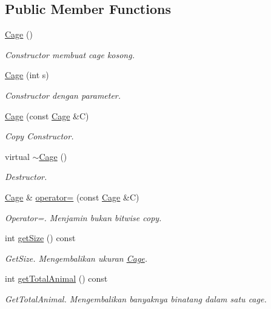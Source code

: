 \subsection*{Public Member Functions}
\begin{DoxyCompactItemize}
\item 
\hyperlink{classCage_ac03246dd263ee9fe6f37336317e62b69}{Cage} ()
\begin{DoxyCompactList}\small\item\em Constructor membuat cage kosong. \end{DoxyCompactList}\item 
\hyperlink{classCage_a8cd728b1eb23303888a153230f96490e}{Cage} (int s)
\begin{DoxyCompactList}\small\item\em Constructor dengan parameter. \end{DoxyCompactList}\item 
\hyperlink{classCage_ae91dd77b358348f937432b6c48b17ea1}{Cage} (const \hyperlink{classCage}{Cage} \&C)
\begin{DoxyCompactList}\small\item\em Copy Constructor. \end{DoxyCompactList}\item 
virtual \hyperlink{classCage_a657259499dfc23c63fc65aeaf8abbb17}{$\sim$\+Cage} ()
\begin{DoxyCompactList}\small\item\em Destructor. \end{DoxyCompactList}\item 
\hyperlink{classCage}{Cage} \& \hyperlink{classCage_affbe712dc15637fc8f311aa175b66e6d}{operator=} (const \hyperlink{classCage}{Cage} \&C)
\begin{DoxyCompactList}\small\item\em Operator=. Menjamin bukan bitwise copy. \end{DoxyCompactList}\item 
int \hyperlink{classCage_a20b2c76f39601430f67645cac4c5888f}{get\+Size} () const 
\begin{DoxyCompactList}\small\item\em Get\+Size. Mengembalikan ukuran \hyperlink{classCage}{Cage}. \end{DoxyCompactList}\item 
int \hyperlink{classCage_a287b1e3bec3e49102141e5848365c9d9}{get\+Total\+Animal} () const 
\begin{DoxyCompactList}\small\item\em Get\+Total\+Animal. Mengembalikan banyaknya binatang dalam satu cage. \end{DoxyCompactList}\item 

\end{DoxyCompactItemize}
